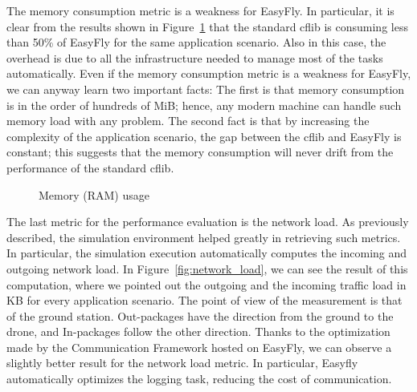 The memory consumption metric is a weakness for EasyFly. 
In particular, it is clear from the results shown in Figure~\ref{fig:ram_usage} that the standard cflib is consuming less than 50\% of EasyFly for the same application scenario.
Also in this case, the overhead is due to all the infrastructure needed to manage most of the tasks automatically.
Even if the memory consumption metric is a weakness for EasyFly, we can anyway learn two important facts:
The first is that memory consumption is in the order of hundreds of MiB; hence, any modern machine can handle such memory load with any problem.
The second fact is that by increasing the complexity of the application scenario, the gap between the cflib and EasyFly is constant; 
this suggests that the memory consumption will never drift from the performance of the standard cflib.

\begin{figure}[t]
    \centering
    \quad
    \quad
    \quad
    \caption{Memory (RAM) usage}\label{fig:ram_usage}
\end{figure}


The last metric for the performance evaluation is the network load. As previously described, the simulation environment helped greatly in retrieving such metrics. 
In particular, the simulation execution automatically computes the incoming and outgoing network load. 
In Figure~\ref{fig:network_load}, we can see the result of this computation, where we pointed out the outgoing and the incoming traffic load in KB for every application scenario.
The point of view of the measurement is that of the ground station. Out-packages have the direction from the ground to the drone, and In-packages follow the other direction. 
Thanks to the optimization made by the Communication Framework hosted on EasyFly, we can observe a slightly better result for the network load metric.
In particular, Easyfly automatically optimizes the logging task, reducing the cost of communication.

